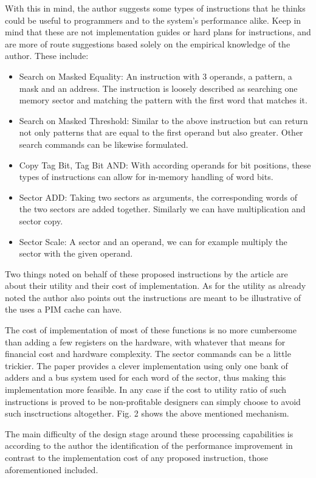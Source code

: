 \documentclass[12pt,twocolumn]{IEEEtran}
\begin{document}
With this in mind, the author suggests some types of instructions that he thinks could be useful to programmers and to the system's performance alike. Keep in mind that these are not implementation guides or hard plans for instructions, and are more of route suggestions based solely on the empirical knowledge of the author. These include:

\begin{itemize}
\item{Search on Masked Equality: An instruction with 3 operands, a pattern, a mask and an address. The instruction is loosely described as searching one memory sector and matching the pattern with the first word that matches it.}
\item{Search on Masked Threshold: Similar to the above instruction but can return not only patterns that are equal to the first operand but also greater. Other search commands can be likewise formulated.}
\item{Copy Tag Bit, Tag Bit AND: With according operands for bit positions, these types of instructions can allow for in-memory handling of word bits.}
\item{Sector ADD: Taking two sectors as arguments, the corresponding words of the two sectors are added together. Similarly we can have multiplication and sector copy.}
\item{Sector Scale: A sector and an operand, we can for example multiply the sector with the given operand.}
\end{itemize}

Two things noted on behalf of these proposed instructions by the article are about their utility and their cost of implementation. As for the utility as already noted the author also points out the instructions are meant to be illustrative of the uses a PIM cache can have. 

The cost of implementation of most of these functions is no more cumbersome than adding a few registers on the hardware, with whatever that means for financial cost and hardware complexity. The sector commands can be a little trickier. The paper provides a clever implementation using only one bank of adders and a bus system used for each word of the sector, thus making this implementation more feasible. In any case if the cost to utility ratio of such instructions is proved to be non-profitable designers can simply choose to avoid such insctructions altogether. Fig. 2 shows the above mentioned mechanism.

The main difficulty of the design stage around these processing capabilities is according to the author the identification of the performance improvement in contrast to the implementation cost of any proposed instruction, those aforementioned included. 
\end{document}

